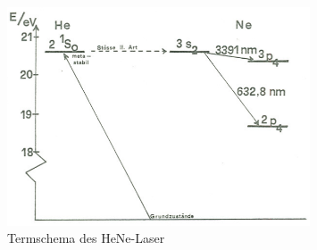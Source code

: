 \begin{figure}[H]
	\centering \includegraphics[width = 0.8\textwidth]{Bilder/henelaser.jpg}
	\caption{Termschema des HeNe-Laser}
\end{figure}

\clearpage

























